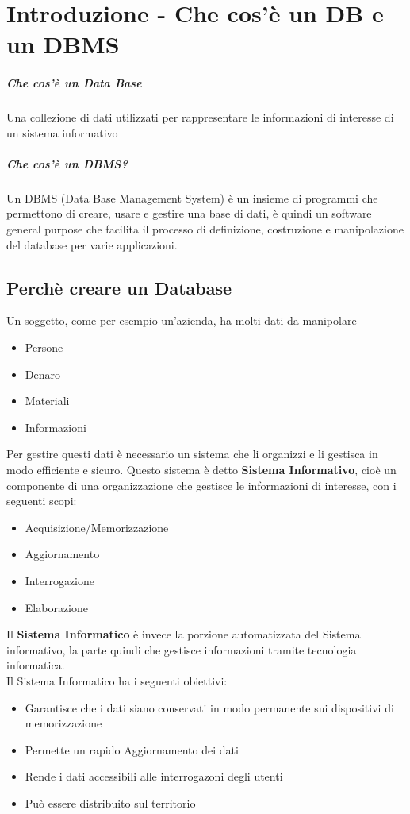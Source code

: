 \chapter{Introduzione - Che cos'è un DB e un DBMS}
\paragraph{Che cos'è un Data Base}
Una collezione di dati utilizzati per rappresentare le informazioni di interesse di un sistema informativo
\paragraph{Che cos'è un DBMS?}
Un DBMS (Data Base Management System) è un insieme di programmi che permettono di creare, usare e gestire una base di dati, è quindi un software
general purpose che facilita il processo di definizione, costruzione e manipolazione del database per varie applicazioni.

\section{Perchè creare un Database}
Un soggetto, come per esempio un'azienda, ha molti dati da manipolare
\begin{itemize}
    \item Persone
    \item Denaro
    \item Materiali
    \item Informazioni
\end{itemize}
Per gestire questi dati è necessario un sistema che li organizzi e li gestisca 
in modo efficiente e sicuro.
Questo sistema è detto \textbf{Sistema Informativo}, cioè un componente
di una organizzazione che gestisce le informazioni di interesse, con i seguenti scopi:
\begin{itemize}
    \item Acquisizione/Memorizzazione
    \item Aggiornamento
    \item Interrogazione
    \item Elaborazione
\end{itemize}
Il \textbf{Sistema Informatico} è invece la porzione automatizzata del Sistema
informativo, la parte quindi che gestisce informazioni tramite tecnologia informatica.
\\ Il Sistema Informatico ha i seguenti obiettivi:
\begin{itemize}
    \item Garantisce che i dati siano conservati in modo permanente sui dispositivi di 
    memorizzazione
    \item Permette un rapido Aggiornamento dei dati
    \item Rende i dati accessibili alle interrogazoni degli utenti
    \item Può essere distribuito sul territorio
\end{itemize}
